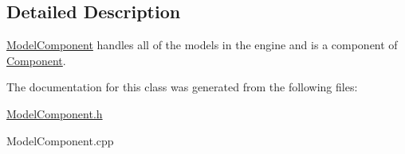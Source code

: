 \subsection{Detailed Description}
\mbox{\hyperlink{class_model_component}{Model\+Component}} handles all of the models in the engine and is a component of \mbox{\hyperlink{class_component}{Component}}. 

The documentation for this class was generated from the following files\+:\begin{DoxyCompactItemize}
\item 
\mbox{\hyperlink{_model_component_8h}{Model\+Component.\+h}}\item 
Model\+Component.\+cpp\end{DoxyCompactItemize}
